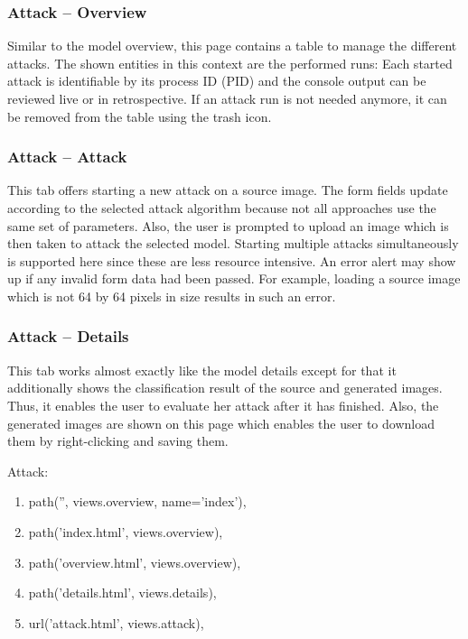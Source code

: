 \subsubsection{Attack -- Overview}
Similar to the model overview, this page contains a table to manage the different attacks.
The shown entities in this context are the performed runs: Each started attack is identifiable by its process ID (PID) and the console output can be reviewed live or in retrospective.
If an attack run is not needed anymore, it can be removed from the table using the trash icon.

\subsubsection{Attack -- Attack}
This tab offers starting a new attack on a source image.
The form fields update according to the selected attack algorithm because not all approaches use the same set of parameters.
Also, the user is prompted to upload an image which is then taken to attack the selected model.
Starting multiple attacks simultaneously is supported here since these are less resource intensive.
An error alert may show up if any invalid form data had been passed.
For example, loading a source image which is not 64 by 64 pixels in size results in such an error.

\subsubsection{Attack -- Details}
This tab works almost exactly like the model details except for that it additionally shows the classification result of the source and generated images.
Thus, it enables the user to evaluate her attack after it has finished.
Also, the generated images are shown on this page which enables the user to download them by right-clicking and saving them.

Attack:
\begin{enumerate}
\item path('', views.overview, name='index'),
\item path('index.html', views.overview),
\item path('overview.html', views.overview),
\item path('details.html', views.details),
\item url('attack.html', views.attack),


\end{enumerate}

